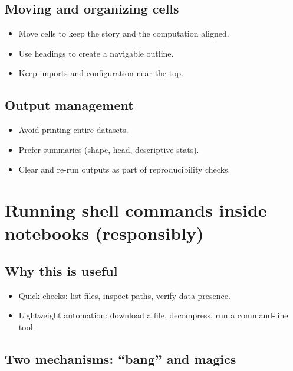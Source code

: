 \subsection{Moving and organizing cells}
\begin{itemize}
\item Move cells to keep the story and the computation aligned.
\item Use headings to create a navigable outline.
\item Keep imports and configuration near the top.
\end{itemize}

\subsection{Output management}
\begin{itemize}
\item Avoid printing entire datasets.
\item Prefer summaries (shape, head, descriptive stats).
\item Clear and re-run outputs as part of reproducibility checks.
\end{itemize}

\section{Running shell commands inside notebooks (responsibly)}
\subsection{Why this is useful}
\begin{itemize}
\item Quick checks: list files, inspect paths, verify data presence.
\item Lightweight automation: download a file, decompress, run a command-line tool.
\end{itemize}

\subsection{Two mechanisms: ``bang'' and magics}

